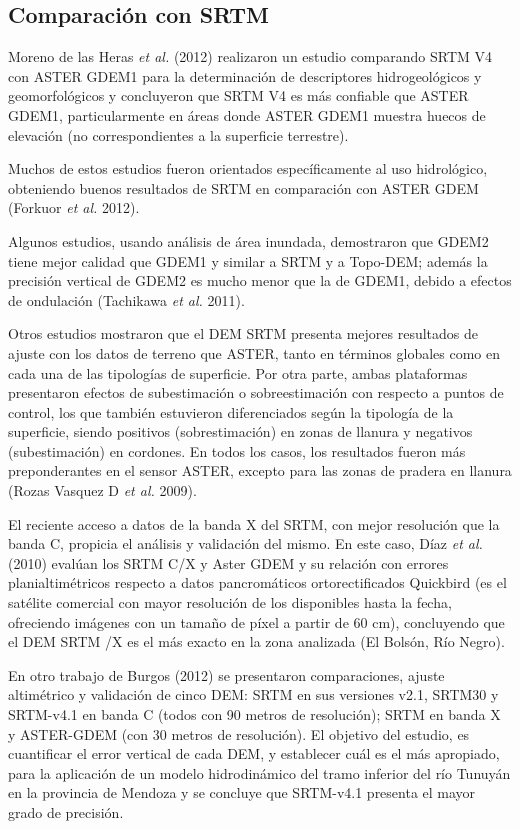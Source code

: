 \documentclass[10pt,a4paper, twoside]{report}
\begin{document}
\subsection{Comparación con SRTM}

Moreno de las Heras \textit{et al.} (2012) realizaron un estudio comparando SRTM V4 con ASTER GDEM1 para la determinación de descriptores hidrogeológicos y geomorfológicos y concluyeron que SRTM V4 es más confiable que ASTER GDEM1, particularmente en áreas donde ASTER GDEM1 muestra huecos de elevación (no correspondientes a la superficie terrestre).

Muchos de estos estudios fueron orientados específicamente al uso hidrológico, obteniendo buenos resultados de SRTM en comparación con ASTER GDEM (Forkuor \textit{et al.} 2012).

Algunos estudios, usando análisis de área inundada, demostraron que GDEM2 tiene mejor calidad que GDEM1 y similar a SRTM y a Topo-DEM; además la precisión vertical de GDEM2 es mucho menor que la de GDEM1, debido a efectos de ondulación (Tachikawa \textit{et al.} 2011).

Otros estudios mostraron que el DEM SRTM presenta mejores resultados de ajuste con los datos de terreno que ASTER, tanto en términos globales como en cada una de las tipologías de superficie. Por otra parte, ambas plataformas presentaron efectos de subestimación o sobreestimación con respecto a puntos de control, los que también estuvieron diferenciados según la tipología de la superficie, siendo positivos (sobrestimación) en zonas de llanura y negativos (subestimación) en cordones. En todos los casos, los resultados fueron más preponderantes en el sensor ASTER, excepto para las zonas de pradera en llanura (Rozas Vasquez D \textit{et al.} 2009).

El reciente acceso a datos de la banda X del SRTM, con mejor resolución que la banda C, propicia el análisis y validación del mismo. En este caso, Díaz \textit{et al.} (2010) evalúan los SRTM C/X y Aster GDEM y su relación con errores planialtimétricos respecto a datos pancromáticos ortorectificados Quickbird (es el satélite comercial con mayor resolución de los disponibles hasta la fecha, ofreciendo imágenes con un tamaño de píxel a partir de 60 cm), concluyendo que el DEM SRTM /X es el más exacto en la zona analizada (El Bolsón, Río Negro). 

En otro trabajo de Burgos (2012) se presentaron comparaciones, ajuste altimétrico y validación de cinco DEM: SRTM en sus versiones v2.1, SRTM30 y SRTM-v4.1 en banda C (todos con 90 metros de resolución); SRTM en banda X y ASTER-GDEM (con 30 metros de resolución). El objetivo del estudio, es cuantificar el error vertical de cada DEM, y
establecer cuál es el más apropiado, para la aplicación de un modelo hidrodinámico del tramo inferior del río Tunuyán en la provincia de Mendoza y se concluye que SRTM-v4.1 presenta el mayor grado de precisión. 
\end{document}
